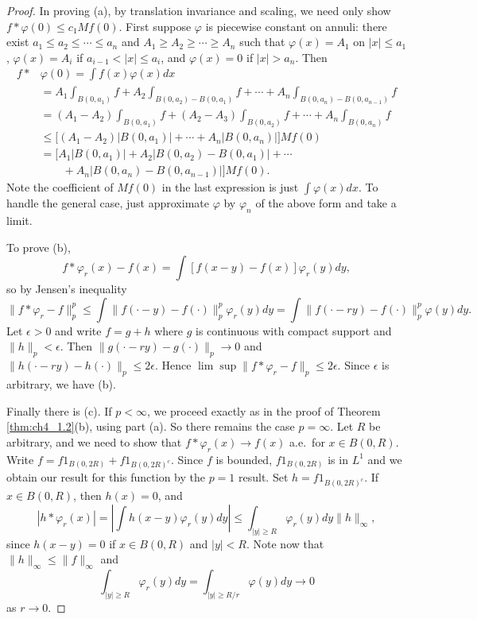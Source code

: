 \begin{proof}
In proving (a), by translation invariance and scaling, we need only show $f * \varphi(0) \leq c_1 Mf(0)$. First suppose $\varphi$ is piecewise constant on annuli: there exist $a_1 \leq a_2 \leq \cdots \leq a_n$ and $A_1 \geq A_2 \geq \cdots \geq A_n$ such that $\varphi(x) = A_1$ on $|x| \leq a_1$, $\varphi(x) = A_i$ if $a_{i-1} < |x| \leq a_i$, and $\varphi(x) = 0$ if $|x| > a_n$. Then
\begin{align*}
    f*&\varphi(0) = \int f(x)\varphi(x)dx \\
    &= A_1 \int_{B(0,a_1)} f + A_2 \int_{B(0,a_2)-B(0,a_1)} f + \cdots + A_n \int_{B(0,a_n)-B(0,a_{n-1})} f \\
    &= (A_1 - A_2)\int_{B(0,a_1)} f + (A_2 - A_3)\int_{B(0,a_2)} f + \cdots + A_n\int_{B(0,a_n)} f \\
    &\leq \Big[(A_1 - A_2)|B(0,a_1)| + \cdots + A_n|B(0,a_n)|\Big] Mf(0) \\
    &= \Big[A_1|B(0,a_1)| + A_2|B(0,a_2) - B(0,a_1)| + \cdots \\
    &\qquad+ A_n|B(0,a_n) - B(0,a_{n-1})|\Big]Mf(0).
\end{align*}
Note the coefficient of $Mf(0)$ in the last expression is just $\int \varphi(x)dx$. To handle the general case, just approximate $\varphi$ by $\varphi_n$ of the above form and take a limit.

To prove (b),
\[
    f * \varphi_r(x) - f(x) = \int [f(x-y) - f(x)]\varphi_r(y)dy,
\]
so by Jensen's inequality
\[
    \|f * \varphi_r - f\|_p^p \leq \int \|f(\cdot-y) - f(\cdot)\|_p^p \varphi_r(y)dy = \int \|f(\cdot - ry) - f(\cdot)\|_p^p \varphi(y)dy.
\]
Let $\epsilon > 0$ and write $f = g + h$ where $g$ is continuous with compact support and $\|h\|_p < \epsilon$. Then $\|g(\cdot - ry) - g(\cdot)\|_p \to 0$ and $\|h(\cdot - ry) - h(\cdot)\|_p \leq 2\epsilon$. Hence $\lim \sup \|f * \varphi_r - f\|_p \leq 2\epsilon$. Since $\epsilon$ is arbitrary, we have (b).

Finally there is (c). If $p < \infty$, we proceed exactly as in the proof of Theorem \ref{thm:ch4_1.2}(b), using part (a). So there remains the case $p = \infty$. Let $R$ be arbitrary, and we need to show that $f * \varphi_r(x) \to f(x)$ a.e.\ for $x \in B(0,R)$. Write $f = f1_{B(0,2R)} + f1_{B(0,2R)^c}$. Since $f$ is bounded, $f1_{B(0,2R)}$ is in $L^1$ and we obtain our result for this function by the $p = 1$ result. Set $h = f1_{B(0,2R)^c}$. If $x \in B(0,R)$, then $h(x) = 0$, and
\[
    |h * \varphi_r(x)| = |\int h(x-y)\varphi_r(y)dy| \leq \int_{|y|\geq R} \varphi_r(y)dy \|h\|_\infty,
\]
since $h(x-y) = 0$ if $x \in B(0,R)$ and $|y| < R$. Note now that $\|h\|_\infty \leq \|f\|_\infty$ and
\mpagebreak
\[
    \int_{|y|\geq R} \varphi_r(y)dy = \int_{|y|\geq R/r} \varphi(y)dy \to 0
\]
as $r \to 0$.
\end{proof}

